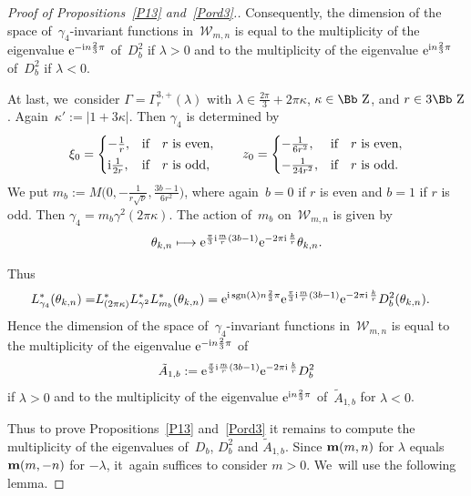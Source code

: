 \documentclass[10pt,a4paper]{amsart}
\newcommand\ZZ{{\mbox{\Bb Z}}}
\newcommand\bm{\textbf{{\rm \textbf{m}}}}
\newcommand{\sgn}{\mathop{{\rm sgn}}}
\numberwithin{equation}{section}
\begin{document}
\begin{proof}[Proof of Propositions~\ref{P13} and~\ref{Pord3}.]
Consequently, the dimension of the space of~$\gamma_4$-invariant functions in~${\mathcal W}_{m,n}$ is equal to the multiplicity of the eigenvalue ${\rm e}^{-{\rm i}n\frac{2}{3}\pi}$ of~$D_b^2$ if $\lambda>0$ and to the multiplicity of the eigenvalue ${\rm e}^{{\rm i}n\frac{2}{3}\pi}$ of~$D^2_b$ if $\lambda<0$.

At last, we~consider $\Gamma=\Gamma^{3,+}_r(\lambda)$ with $\lambda \in \frac{2\pi} 3+2\pi\kappa$, $\kappa\in\ZZ$, and $r\in3\ZZ$. Again~$\kappa':=|1+3\kappa|$.
Then $\gamma_4$ is determined by
\begin{gather*}
\xi_0=\begin{cases}
-\frac{1}{r},&\text{if\quad $r$ is even},
\\[.5ex]
{\rm i}\frac{1}{2r},&\text{if\quad $r$ is odd},
\end{cases}\qquad
z_0=\begin{cases}
-\frac{1}{6r^2},&\text{if\quad $r$ is even},
\\[.5ex]
-\frac{1}{24r^2},&\text{if\quad $r$ is odd}.
\end{cases}
\end{gather*}
We put $m_b:=M\big(0,-\frac{1}{r\sqrt\nu},\frac{3b-1}{6r^2}\big)$, where again~$b=0$ if $r$ is even and $b=1$ if $r$ is odd. Then $\gamma_4=m_b\gamma^2(2\pi\kappa)$.
The action of~$m_b$ on~${\mathcal W}_{m,n}$ is given by
\begin{gather*}
\theta_{k,n}\longmapsto {\rm e}^{\frac{\pi}{3}{\rm i}\frac{m}{r}(3b-1)}{\rm e}^{-2\pi {\rm i}\,\frac{k}{r}}\theta_{k,n}.
\end{gather*}

Thus
\begin{align*}
L_{\gamma_{4}}^*(\theta_{k,n})=&L^*_{(2\pi\kappa)}L^*_{\gamma^2}L^*_{m_b}(\theta_{k,n})={\rm e}^{{\rm i}\sgn(\lambda)n\frac{2}{3}\pi}{\rm e}^{\frac{\pi}{3}{\rm i}\frac{m}{r}(3b-1)}{\rm e}^{-2\pi {\rm i}\,\frac{k}{r}}D^2_b(\theta_{k,n}).
\end{align*}
Hence the dimension of the space of~$\gamma_4$-invariant functions in~${\mathcal W}_{m,n}$ is equal to the multiplicity of the eigenvalue ${\rm e}^{-{\rm i}n\frac{2}{3}\pi}$ of
\begin{gather*}
\tilde A_{1,b}:={\rm e}^{\frac{\pi}{3}{\rm i}\frac{m}{r}(3b-1)}{\rm e}^{-2\pi {\rm i}\,\frac{k}{r}}D^2_b
\end{gather*}
if $\lambda>0$ and to the multiplicity of the eigenvalue ${\rm e}^{{\rm i}n\frac{2}{3}\pi}$ of~$\tilde A_{1,b}$ for $\lambda<0$.

Thus to prove Propositions~\ref{P13} and~\ref{Pord3} it remains to compute the multiplicity of the eigenvalues of~$D_b$, $D^2_b$ and $\tilde A_{1,b}$. Since $\bm(m,n)$ for $\lambda$ equals $\bm(m,-n)$ for $-\lambda$, it~again suffices to consider $m>0$. We~will use the following lemma.


\end{proof}
\end{document}
